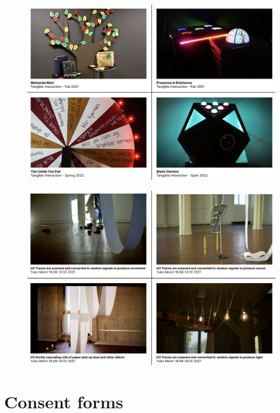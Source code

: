 \begin{figure}[H]
\includegraphics[width=13cm]{pictures/dataset/tangible.png}
\centering 
\end{figure}

\begin{figure}[H]
\includegraphics[width=13cm]{pictures/dataset/yuko_mohri.png}
\centering 
\end{figure}

\section{Consent forms}

